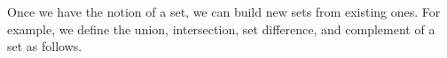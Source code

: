 \begin{comment}

\ActivitySolution

\ba
\item Two sets $A$ and $B$ are equal if $A \subseteq B$ and $B \subseteq A$. So to prove that two sets $A$ and $B$ are equal, we choose an arbitrary element $a$ in $A$ and show that $a \in B$, and then choose an arbitrary element $b \in B$ and show that $b \in A$. 

\item First we show that $A \subseteq B$. Let $a \in A$. Then $a < 2$. This implies that $a - 1 < 2-1 = 1$, so $a \in B$. Thus, $A \subseteq B$. Now assume that $b \in B$. Then $b-1 < 1$. But this implies that $(b-1)+1 < 1+1$ or $b < 2$. Thus $b \in A$ and $B \subseteq A$. The two containments demonstrate that $A = B$. 

\item We show that $B \subset A$, but $A \neq B$. Let $b \in B$. Then $4$ divides $b-2$. It follows that there exists an integer $k$ such that $b-2 = 4k$. So $b = 2+4k = 2(1+2k)$ and $2$ divides $b$. We conclude that $b \in A$ and $B \subseteq A$. However, $2$ divides $4$, but $4$ does not divide $4-2$. So $A$ is not a subset of $B$. 

\item We will prove that $A = B$. Let $a \in A$. Then $a$ is odd, so there exists an integer $q$ such that $a = 2q+1$. Now $q$ is either even or odd, and we consider the cases. If $q$ is even, then $q = 2p$ for some integer $p$. In this case $a = 2(2p) + 1 = 4p+1$ and $4$ divides $a-1$. If $q$ is odd, then $q =2p+1$ for some integer $p$. Then we have $a = 2(2p+1)+1 = 4p+3$ and $4$ divides $a-3$. Thus, $a \in B$ and $A \subseteq B$. Now let $b \in B$. Then $4$ divides $b-1$ or $4$ divides $b-3$. If $4$ divides $b-1$, then $b-1 = 4k$ for some integer $k$. But then $b = 1+4k = 1+2(2k)$ for some integer $k$, which shows that $b$ is odd. If $4$ divides $b-3$, then $b = 4k+3$ for some integer $k$. It follows that $b = 3+4k = 1+2(1+2k)$ for some integer $k$, which again shows that $b$ is odd. Thus $b \in A$ and $B \subseteq A$. The two containments demonstrate that $A = B$. 

\ea

\end{comment}

Once we have the notion of a set, we can build new sets from existing ones. For example, we define the union, intersection, set difference, and complement of a set as follows.

